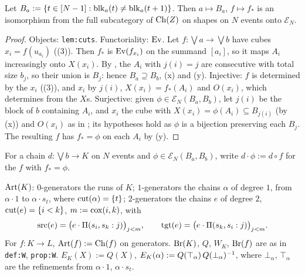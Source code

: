 \documentclass[11pt]{article}
\newcommand{\EN}{\mathcal{E}_N}
\newcommand{\altw}[3]{\Pi(#1,#2:#3)}
\begin{document}
\begin{proposition}\label{prop:cubes}
  Let $B_a := \{t \in [N-1] : \operatorname{blk}_a(t) \neq \operatorname{blk}_a(t+1)\}$. Then $a \mapsto B_a$, $f \mapsto f_*$ is
  an isomorphism from the full subcategory of $\operatorname{Ch}(Z)$ on shapes on $N$ events onto $\EN$.
\end{proposition}
\begin{proof}
  Objects: \texttt{lem:cuts}. Functoriality: $\operatorname{Ev}$. Let $f : \bigvee a \to \bigvee b$ have cubes
  $x_i = f(u_{a_i})$ ((3)). Then $f_*$ is $\operatorname{Ev}(f_{x_i})$ on the summand $[a_i]$, so it
  maps $A_i$ increasingly onto $X(x_i)$. By , the $A_i$ with $j(i) = j$ are
  consecutive with total size $b_j$, so their union is $B_j$: hence $B_a \supseteq B_b$, (x) and
  (y). Injective: $f$ is determined by the $x_i$ ((3)), and $x_i$ by $j(i)$, $X(x_i) =
  f_*(A_i)$ and $O(x_i)$, which  determines from the $X$s. Surjective: given $\phi
  \in \EN(B_a,B_b)$, let $j(i)$ be the block of $b$ containing $A_i$, and $x_i$ the cube with $X(x_i) =
  \phi(A_i) \subseteq B_{j(i)}$ (by (x)) and $O(x_i)$ as in ; its hypotheses hold as
  $\phi$ is a bijection preserving each $B_j$. The resulting $f$ has $f_* = \phi$ on each $A_i$ by
  (y).
\end{proof}

For a chain $d : \bigvee b \to K$ on $N$ events and $\phi \in \EN(B_a,B_b)$, write $d\cdot\phi :=
d \circ f$ for the $f$ with $f_* = \phi$.

\begin{definition}\label{def:artK}
  $\operatorname{Art}(K)$: $0$-generators the runs of $K$; $1$-generators the chains $\alpha$ of degree $1$, from
  $\alpha\cdot1$ to $\alpha\cdot s_t$, where $\operatorname{cut}(\alpha) = \{t\}$; $2$-generators the chains $e$
  of degree $2$, $\operatorname{cut}(e) = \{i < k\}$, $m := \operatorname{cox}(i,k)$, with
  \[
    \src(e) = \bigl(e\cdot\altw{s_i}{s_k}j\bigr)_{j<m}, \qquad \tgt(e) =
    \bigl(e\cdot\altw{s_k}{s_i}j\bigr)_{j<m} .
  \]
  For $f : K \to L$, $\operatorname{Art}(f) := \operatorname{Ch}(f)$ on generators. $\operatorname{Br}(K)$, $Q$, $W_K$, $\operatorname{Br}(f)$ are as in
  \texttt{def:W}, \texttt{prop:W}. $E_K(X) := Q(X)$, $E_K(\alpha) := Q(\top_\alpha)\,Q(\bot_\alpha)^{-1}$,
  where $\bot_\alpha$, $\top_\alpha$ are the refinements from $\alpha\cdot1$, $\alpha\cdot s_t$.
\end{definition}
\end{document}
